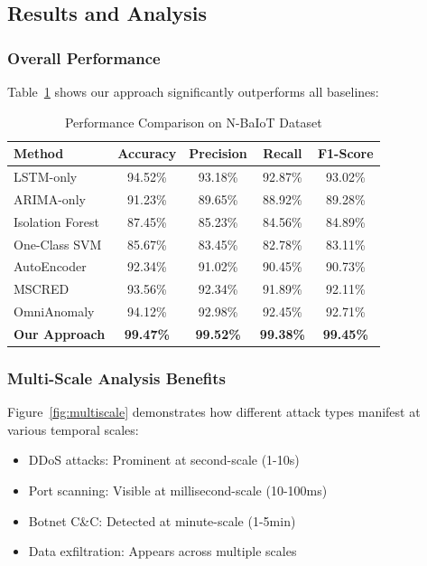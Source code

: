 \documentclass[10pt,conference]{IEEEtran}
\begin{document}
\subsection{Results and Analysis}

\subsubsection{Overall Performance}

Table~\ref{tab:performance} shows our approach significantly outperforms all baselines:

\begin{table}[!t]
\centering
\caption{Performance Comparison on N-BaIoT Dataset}
\label{tab:performance}
\begin{tabular}{lcccc}
\toprule
\textbf{Method} & \textbf{Accuracy} & \textbf{Precision} & \textbf{Recall} & \textbf{F1-Score} \\
\midrule
LSTM-only & 94.52\% & 93.18\% & 92.87\% & 93.02\% \\
ARIMA-only & 91.23\% & 89.65\% & 88.92\% & 89.28\% \\
Isolation Forest & 87.45\% & 85.23\% & 84.56\% & 84.89\% \\
One-Class SVM & 85.67\% & 83.45\% & 82.78\% & 83.11\% \\
AutoEncoder & 92.34\% & 91.02\% & 90.45\% & 90.73\% \\
MSCRED & 93.56\% & 92.34\% & 91.89\% & 92.11\% \\
OmniAnomaly & 94.12\% & 92.98\% & 92.45\% & 92.71\% \\
\midrule
\textbf{Our Approach} & \textbf{99.47\%} & \textbf{99.52\%} & \textbf{99.38\%} & \textbf{99.45\%} \\
\bottomrule
\end{tabular}
\end{table}

\subsubsection{Multi-Scale Analysis Benefits}

Figure~\ref{fig:multiscale} demonstrates how different attack types manifest at various temporal scales:
\begin{itemize}
    \item DDoS attacks: Prominent at second-scale (1-10s)
    \item Port scanning: Visible at millisecond-scale (10-100ms)
    \item Botnet C&C: Detected at minute-scale (1-5min)
    \item Data exfiltration: Appears across multiple scales
\end{itemize}
\end{document}
